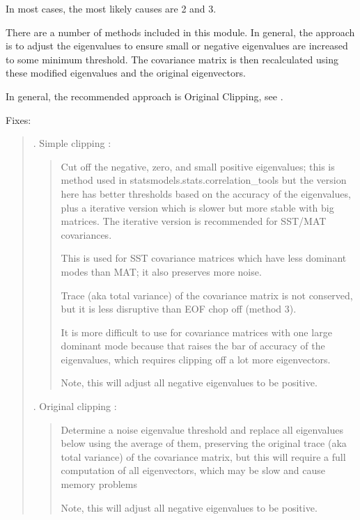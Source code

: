 \documentclass[letterpaper,10pt,english]{sphinxmanual}
\begin{document}
\sphinxAtStartPar
In most cases, the most likely causes are 2 and 3.

\sphinxAtStartPar
There are a number of methods included in this module. In general, the approach
is to adjust the eigenvalues to ensure small or negative eigenvalues are
increased to some minimum threshold. The covariance matrix is then re\sphinxhyphen{}calculated
using these modified eigenvalues and the original eigenvectors.

\sphinxAtStartPar
In general, the recommended approach is Original Clipping, see
{\hyperref[\detokenize{misc:glomar_gridding.covariance_tools.eigenvalue_clip}]{}}.

\sphinxAtStartPar
Fixes:
\begin{quote}

. Simple clipping \sphinxhyphen{}
{\hyperref[\detokenize{misc:glomar_gridding.covariance_tools.simple_clipping}]{}}:
\begin{quote}

\sphinxAtStartPar
Cut off the negative, zero, and small positive eigenvalues; this is
method used in statsmodels.stats.correlation\_tools but the version here
has better thresholds based on the accuracy of the eigenvalues, plus a
iterative version which is slower but more stable with big matrices. The
iterative version is recommended for SST/MAT covariances.

\sphinxAtStartPar
This is used for SST covariance matrices which have less dominant modes
than MAT; it also preserves more noise.

\sphinxAtStartPar
Trace (aka total variance) of the covariance matrix is not conserved,
but it is less disruptive than EOF chop off (method 3).

\sphinxAtStartPar
It is more difficult to use for covariance matrices with one large
dominant mode because that raises the bar of accuracy of the
eigenvalues, which requires clipping off a lot more eigenvectors.

\sphinxAtStartPar
Note, this will adjust all negative eigenvalues to be positive.
\end{quote}

. Original clipping \sphinxhyphen{}
{\hyperref[\detokenize{misc:glomar_gridding.covariance_tools.eigenvalue_clip}]{}}:
\begin{quote}

\sphinxAtStartPar
Determine a noise eigenvalue threshold and replace all eigenvalues below
using the average of them, preserving the original trace (aka total
variance) of the covariance matrix, but this will require a full
computation of all eigenvectors, which may be slow and cause memory
problems

\sphinxAtStartPar
Note, this will adjust all negative eigenvalues to be positive.
\end{quote}
\end{quote}
\end{document}
